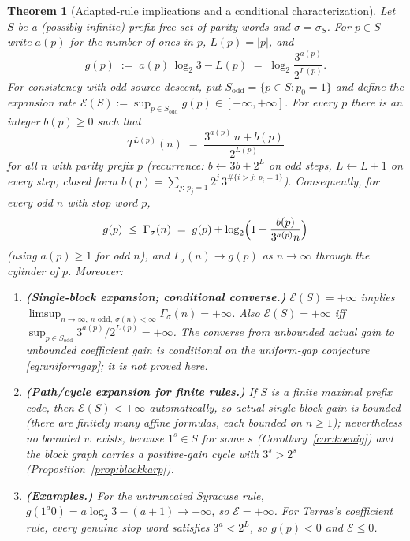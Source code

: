 \documentclass[11pt]{amsart}
\newtheorem{theorem}{Theorem}[section]
\theoremstyle{definition}
\theoremstyle{remark}
\begin{document}
\begin{theorem}[Adapted-rule implications and a conditional characterization]\label{thm:characterize}
Let $S$ be a (possibly infinite) prefix-free set of parity words and $\sigma = \sigma_S$. For $p \in S$ write $a(p)$ for the number of ones in $p$, $L(p) = |p|$, and
\begin{equation}\label{eq:wordgain}
g(p) \;:=\; a(p)\,\log_2 3 - L(p) \;=\; \log_2 \frac{3^{a(p)}}{2^{L(p)}} .
\end{equation}
For consistency with odd-source descent, put $S_{\mathrm{odd}}=\{p\in S:p_0=1\}$ and define the \emph{expansion rate} $\mathcal{E}(S) := \sup_{p \in S_{\mathrm{odd}}} g(p) \in [-\infty, +\infty]$. For every $p$ there is an integer $b(p) \ge 0$ such that
\begin{equation}\label{eq:affine}
T^{L(p)}(n) \;=\; \frac{3^{a(p)}\, n + b(p)}{2^{L(p)}}
\end{equation}
for all $n$ with parity prefix $p$ (recurrence: $b \leftarrow 3b + 2^{L}$ on odd steps, $L \leftarrow L+1$ on every step; closed form $b(p) = \sum_{j:\, p_j=1} 2^j\, 3^{\#\{i>j:\, p_i=1\}}$). Consequently, for every odd $n$ with stop word $p$,
\begin{equation}\label{eq:gammasandwich}
g(p) \;\le\; \Gamma_\sigma(n) \;=\; g(p) + \log_2\Bigl(1 + \frac{b(p)}{3^{a(p)} n}\Bigr)
\end{equation}
(using $a(p) \ge 1$ for odd $n$), and $\Gamma_\sigma(n) \to g(p)$ as $n \to \infty$ through the cylinder of $p$. Moreover:
\begin{enumerate}
\item \textbf{(Single-block expansion; conditional converse.)} $\mathcal E(S)=+\infty$ implies $\limsup_{n\to\infty,\ n\text{ odd},\ \sigma(n)<\infty}\Gamma_\sigma(n)=+\infty$. Also $\mathcal E(S)=+\infty$ iff $\sup_{p\in S_{\mathrm{odd}}}3^{a(p)}/2^{L(p)}=+\infty$. The converse from unbounded actual gain to unbounded coefficient gain is conditional on the uniform-gap conjecture \eqref{eq:uniformgap}; it is not proved here.
\item \textbf{(Path/cycle expansion for finite rules.)} If $S$ is a finite maximal prefix code, then $\mathcal{E}(S) < +\infty$ automatically, so actual single-block gain is bounded (there are finitely many affine formulas, each bounded on $n\ge1$); nevertheless no bounded $w$ exists, because $1^s \in S$ for some $s$ (Corollary~\ref{cor:koenig}) and the block graph carries a positive-gain cycle with $3^s > 2^s$ (Proposition~\ref{prop:blockkarp}).
\item \textbf{(Examples.)} For the untruncated Syracuse rule, $g(1^a 0) = a\log_2 3 - (a+1) \to +\infty$, so $\mathcal{E} = +\infty$. For Terras's coefficient rule, every genuine stop word satisfies $3^{a} < 2^{L}$, so $g(p) < 0$ and $\mathcal{E} \le 0$.
\end{enumerate}
\end{theorem}
\end{document}
